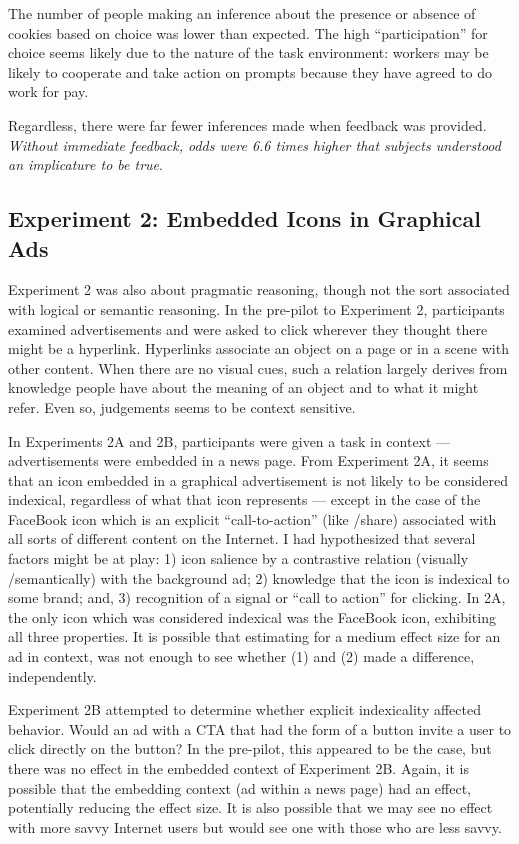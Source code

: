 The number of people making an inference about the presence or absence of cookies based on choice was lower than expected. The high ``participation'' for choice seems likely due to the nature of the task environment: workers may be likely to cooperate and take action on prompts because they have agreed to do work for pay. 

Regardless, there were far fewer inferences made when feedback was provided. \emph{Without immediate feedback, odds were 6.6 times higher that subjects understood an implicature to be true}.

\subsection{Experiment 2: Embedded Icons in Graphical Ads}
\label{experiment2:embeddediconsingraphicalads}

Experiment 2 was also about pragmatic reasoning, though not the sort associated with logical or semantic reasoning. In the pre-pilot to Experiment 2, participants examined advertisements and were asked to click wherever they thought there might be a hyperlink. Hyperlinks associate an object on a page or in a scene with other content. When there are no visual cues, such a relation largely derives from knowledge people have about the meaning of an object and to what it might refer. Even so, judgements seems to be context sensitive.

In Experiments 2A and 2B, participants were given a task in context --- advertisements were embedded in a news page. From Experiment 2A, it seems that an icon embedded in a graphical advertisement is not likely to be considered indexical, regardless of what that icon represents --- except in the case of the FaceBook icon which is an explicit ``call-to-action'' (like \slash  share) associated with all sorts of different content on the Internet. I had hypothesized that several factors might be at play: 1) icon salience by a contrastive relation (visually \slash  semantically) with the background ad; 2) knowledge that the icon is indexical to some brand; and, 3) recognition of a signal or ``call to action'' for clicking. In 2A, the only icon which was considered indexical was the FaceBook icon, exhibiting all three properties. It is possible that estimating for a medium effect size for an ad in context, was not enough to see whether (1) and (2) made a difference, independently.

Experiment 2B attempted to determine whether explicit indexicality affected behavior. Would an ad with a CTA that had the form of a button invite a user to click directly on the button? In the pre-pilot, this appeared to be the case, but there was no effect in the embedded context of Experiment 2B. Again, it is possible that the embedding context (ad within a news page) had an effect, potentially reducing the effect size. It is also possible that we may see no effect with more savvy Internet users but would see one with those who are less savvy.

